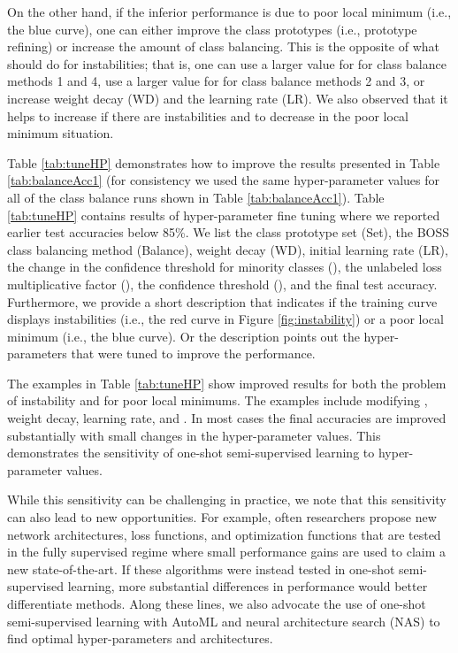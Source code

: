 \documentclass[final]{cvpr}
\newcommand{\OSSSL}{one-shot semi-supervised learning }
\newcommand{\OSSSLno}{one-shot semi-supervised learning}
\newcommand{\HP}{hyper-parameter }
\newcommand{\HPs}{hyper-parameters }
\begin{document}
On the other hand, if the inferior performance is due to poor local minimum (i.e., the blue curve), one can either improve the class prototypes (i.e., prototype refining) or increase the amount of class balancing.
This is the opposite of what should do for instabilities; that is, one can use a larger value for  for class balance methods 1 and 4, use a larger value for  for class balance methods 2 and 3, or increase weight decay (WD) and the learning rate (LR).
We also observed that it helps to increase  if there are instabilities and to decrease  in the poor local minimum situation.

Table \ref{tab:tuneHP} demonstrates how to improve the results presented in Table \ref{tab:balanceAcc1} (for consistency we used the same \HP values for all of the class balance runs shown in Table \ref{tab:balanceAcc1}).
Table \ref{tab:tuneHP} contains results of \HP fine tuning where we reported earlier test accuracies below 85\%.
We list the class prototype set (Set), the BOSS class balancing method (Balance), weight decay (WD), initial learning rate (LR), the change in the confidence threshold for minority classes (), the unlabeled loss multiplicative factor (), the confidence threshold (), and the final test accuracy.
Furthermore, we provide a short description that indicates if the training curve displays instabilities (i.e., the red curve in Figure \ref{fig:instability}) or a poor local minimum (i.e., the blue curve).
Or the description points out the \HPs that were tuned to improve the performance.



The examples in Table \ref{tab:tuneHP} show improved results for both the problem of instability and for poor local minimums.
The examples include modifying , weight decay, learning rate, and .
In most cases the final accuracies are improved substantially with small changes in the \HP values.
This demonstrates the sensitivity of \OSSSL to \HP values.

While this sensitivity can be challenging in practice, we note that this sensitivity can also lead to new opportunities.
For example, often researchers propose new network architectures, loss functions, and optimization functions that are tested in the fully supervised regime where small performance gains are used to claim a new state-of-the-art.
If these algorithms were instead tested in \OSSSLno, more substantial differences in performance would better differentiate methods.
Along these lines, we also advocate the use of \OSSSL with AutoML and neural architecture search (NAS) \cite{elsken2018neural} to find optimal hyper-parameters and architectures.
\end{document}
